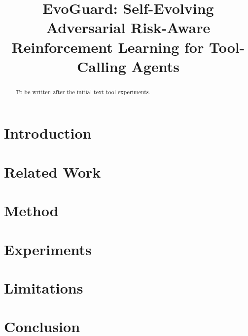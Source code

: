 \documentclass{article}
\title{EvoGuard: Self-Evolving Adversarial Risk-Aware Reinforcement Learning for Tool-Calling Agents}
\author{}
\date{}
\begin{document}
\maketitle

\begin{abstract}
To be written after the initial text-tool experiments.
\end{abstract}

\section{Introduction}

\section{Related Work}

\section{Method}

\section{Experiments}

\section{Limitations}

\section{Conclusion}
\end{document}
